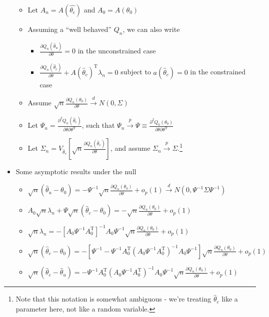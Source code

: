 \documentclass[12pt,english]{article}
\newcommand{\T}{\ensuremath{\text{T}}}
\begin{document}
\begin{itemize}
\begin{itemize}
		\item Let $A_{n} = A(\hat{\theta_{c}})$ and $A_{0} = A(\theta_{0})$
		\item Assuming a ``well behaved'' $Q_{n}$, we can also write
		\begin{itemize}
			\item $\frac{\partial Q_{n}(\hat{\theta}_{u})}{\partial \theta} = 0$ in the unconstrained case
			\item $\frac{\partial Q_{n}(\hat{\theta}_{c})}{\partial \theta} + A(\hat{\theta}_{c})^{\T} \lambda_{n} = 0$ subject to $a(\hat{\theta}_{c}) = 0$ in the constrained case
		\end{itemize}
		\item Assume $\sqrt{n} \frac{\partial Q_{n}(\theta_{0})}{\partial \theta} \overset{d}{\to} N(0, \Sigma)$
		\item Let $\Psi_{n} = \frac{\partial^{2} Q_{n}(\hat{\theta}_{c})}{\partial \theta \partial \theta^{\T}}$, such that $\Psi_{n} \overset{p}{\to} \Psi \equiv \frac{\partial^{2} Q_{0}(\theta_{0})}{\partial \theta \partial \theta^{\T}}$
		\item Let $\Sigma_{n} = V_{\hat{\theta}_{c}} \left[ \sqrt{n} \frac{\partial Q_{n}(\hat{\theta}_{c})}{\partial \theta} \right]$, and assume $\Sigma_{n} \overset{p}{\to} \Sigma$.\footnote{Note that this notation is somewhat ambiguous - we're treating $\hat{\theta}_{c}$ like a parameter here, not like a random variable.}
	\end{itemize}
	\item Some asymptotic results under the null
	\begin{itemize}
		\item $\sqrt{n}(\hat{\theta}_{u} - \theta_{0})  = -\Psi^{-1} \sqrt{n} \frac{\partial Q_{n}(\theta_{0})}{\partial \theta} + o_{p}(1) \overset{d}{\to} N(0, \Psi^{-1} \Sigma \Psi^{-1})$
		\item $A_{0} \sqrt{n} \lambda_{n} + \Psi \sqrt{n} (\hat{\theta}_{c} - \theta_{0}) = -\sqrt{n} \frac{\partial Q_{n}(\theta_{0})}{\partial \theta} + o_{p}(1)$
		\item $ \sqrt{n} \lambda_{n} = - [A_{0} \Psi^{-1} A_{0}^{\T}]^{-1} A_{0} \Psi^{-1} \sqrt{n} \frac{\partial Q_{n}(\theta_{0})}{\partial \theta} + o_{p}(1)$
		\item $ \sqrt{n} (\hat{\theta}_{c} - \theta_{0}) = -[\Psi^{-1} - \Psi^{-1} A_{0}^{\T} (A_{0} \Psi^{-1} A_{0}^{\T})^{-1} A_{0} \Psi^{-1}] \sqrt{n} \frac{\partial Q_{n}(\theta_{0})}{\partial \theta} + o_{p}(1) $
		\item $ \sqrt{n} (\hat{\theta}_{c} - \hat{\theta}_{u})  = - \Psi^{-1} A_{0}^{\T} (A_{0} \Psi^{-1} A_{0}^{\T})^{-1} A_{0} \Psi^{-1} \sqrt{n} \frac{\partial Q_{n}(\theta_{0})}{\partial \theta} + o_{p}(1)$

\end{itemize}
\end{itemize}
\end{document}
